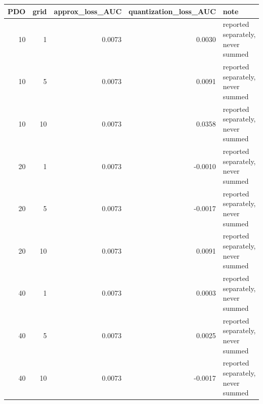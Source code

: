 \begin{tabular}{rrrrl}
\toprule
PDO & grid & approx_loss_AUC & quantization_loss_AUC & note \\
\midrule
10 & 1 & 0.0073 & 0.0030 & reported separately, never summed \\
10 & 5 & 0.0073 & 0.0091 & reported separately, never summed \\
10 & 10 & 0.0073 & 0.0358 & reported separately, never summed \\
20 & 1 & 0.0073 & -0.0010 & reported separately, never summed \\
20 & 5 & 0.0073 & -0.0017 & reported separately, never summed \\
20 & 10 & 0.0073 & 0.0091 & reported separately, never summed \\
40 & 1 & 0.0073 & 0.0003 & reported separately, never summed \\
40 & 5 & 0.0073 & 0.0025 & reported separately, never summed \\
40 & 10 & 0.0073 & -0.0017 & reported separately, never summed \\
\bottomrule
\end{tabular}
